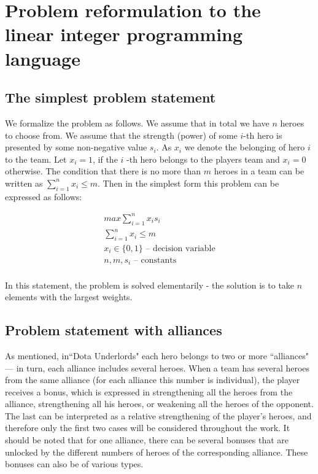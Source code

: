 \documentclass[smallextended]{svjour3}       %
\begin{document}
\section{Problem reformulation to the linear integer programming language }
\label{SectionDUIP}

\subsection{The simplest problem statement}

We formalize the problem as follows. We assume that in total we have $n$ heroes to choose from. We assume that the strength (power) of some $i$-th hero is presented by some non-negative value $s_i$. As $x_i$ we denote the belonging of hero $i$ to the team. Let $ x_i = 1 $, if the $ i $ -th hero belongs to the players team and $ x_i = 0 $ otherwise. The condition that there is no more than $m$ heroes in a team  can be written as $ \sum_{i=1}^n x_i \leq m $. Then in the simplest form this problem can be expressed as follows:

\begin{equation}
\begin{gathered}
    max \sum_{i=1}^n x_i s_i \\
    \sum_{i=1}^n x_i \leq m \\
    x_i \in \{0, 1\} \text{ – decision variable} \\
   n, m, s_i \text{ – constants}  \\
\end{gathered}
\end{equation}


In this statement, the problem is solved elementarily - the solution is to take $ n $ elements with the largest weights.

\subsection{Problem statement with alliances}
As mentioned, in``Dota Underlords" each hero belongs to two or more ``alliances" --- in turn, each alliance includes several heroes. When a team has several heroes from the same alliance (for each alliance this number is individual), the player receives a bonus, which is expressed in strengthening all the heroes from the alliance, strengthening all his heroes, or weakening all the heroes of the opponent. The last can be interpreted as a relative strengthening of the player’s heroes, and therefore only the first two cases will be considered throughout the work. It should be noted that for one alliance, there can be several bonuses that are unlocked by the different numbers of heroes of the corresponding alliance. These bonuses can also be of various types.
\end{document}
